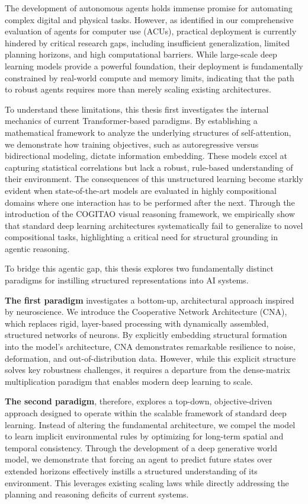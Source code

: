 The development of autonomous agents holds immense promise for automating complex digital and physical tasks. However, as identified in our comprehensive evaluation of agents for computer use (ACUs), practical deployment is currently hindered by critical research gaps, including insufficient generalization, limited planning horizons, and high computational barriers. While large-scale deep learning models provide a powerful foundation, their deployment is fundamentally constrained by real-world compute and memory limits, indicating that the path to robust agents requires more than merely scaling existing architectures.

To understand these limitations, this thesis first investigates the internal mechanics of current Transformer-based paradigms. By establishing a mathematical framework to analyze the underlying structures of self-attention, we demonstrate how training objectives, such as autoregressive versus bidirectional modeling, dictate information embedding. These models excel at capturing statistical correlations but lack a robust, rule-based understanding of their environment. The consequences of this unstructured learning become starkly evident when state-of-the-art models are evaluated in highly compositional domains where one interaction has to be performed after the next. Through the introduction of the COGITAO visual reasoning framework, we empirically show that standard deep learning architectures systematically fail to generalize to novel compositional tasks, highlighting a critical need for structural grounding in agentic reasoning.

To bridge this agentic gap, this thesis explores two fundamentally distinct paradigms for instilling structured representations into AI systems.

\textbf{The first paradigm} investigates a bottom-up, architectural approach inspired by neuroscience. We introduce the Cooperative Network Architecture (CNA), which replaces rigid, layer-based processing with dynamically assembled, structured networks of neurons. By explicitly embedding structural formation into the model’s architecture, CNA demonstrates remarkable resilience to noise, deformation, and out-of-distribution data. However, while this explicit structure solves key robustness challenges, it requires a departure from the dense-matrix multiplication paradigm that enables modern deep learning to scale.

\textbf{The second paradigm}, therefore, explores a top-down, objective-driven approach designed to operate within the scalable framework of standard deep learning. Instead of altering the fundamental architecture, we compel the model to learn implicit environmental rules by optimizing for long-term spatial and temporal consistency. Through the development of a deep generative world model, we demonstrate that forcing an agent to predict future states over extended horizons effectively instills a structured understanding of its environment. This leverages existing scaling laws while directly addressing the planning and reasoning deficits of current systems.

